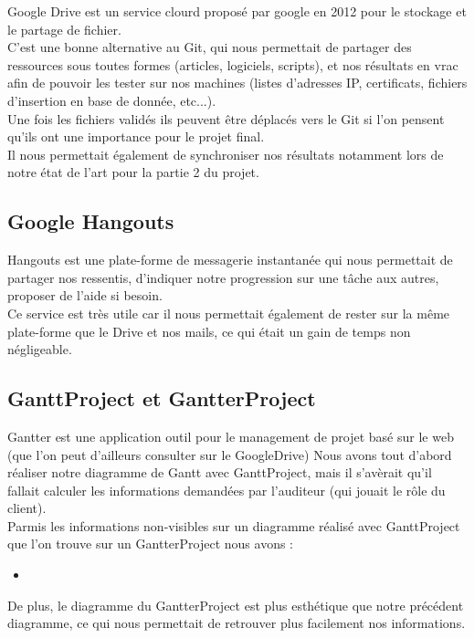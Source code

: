 Google Drive est un service clourd proposé par google en 2012 pour le stockage et le partage de fichier.\\
C'est une bonne alternative au Git, qui nous permettait de partager des ressources sous toutes formes (articles, logiciels, scripts), et nos résultats en vrac afin de pouvoir les tester sur nos machines (listes d'adresses IP, certificats, fichiers d'insertion en base de donnée, etc...).\\
Une fois les fichiers validés ils peuvent être déplacés vers le Git si l'on pensent qu'ils ont une importance pour le projet final.\\
Il nous permettait également de synchroniser nos résultats notamment lors de notre état de l'art pour la partie 2 du projet.

\subsection{Google Hangouts}

Hangouts est une plate-forme de messagerie instantanée qui nous permettait de partager nos ressentis, d'indiquer notre progression sur une tâche aux autres, proposer de l'aide si besoin.\\
Ce service est très utile car il nous permettait également de rester sur la même plate-forme que le Drive et nos mails, ce qui était un gain de temps non négligeable.

\subsection{GanttProject et GantterProject}

Gantter est une application outil pour le management de projet basé sur le web (que l'on peut d'ailleurs consulter sur le GoogleDrive)
Nous avons tout d'abord réaliser notre diagramme de Gantt avec GanttProject, mais il s'avèrait qu'il fallait calculer les informations demandées par l'auditeur (qui jouait le rôle du client).\\
Parmis les informations non-visibles sur un diagramme réalisé avec GanttProject que l'on trouve sur un GantterProject nous avons :
\begin{itemize}
\item
\end{itemize}

De plus, le diagramme du GantterProject est plus esthétique que notre précédent diagramme, ce qui nous permettait de retrouver plus facilement nos informations.

